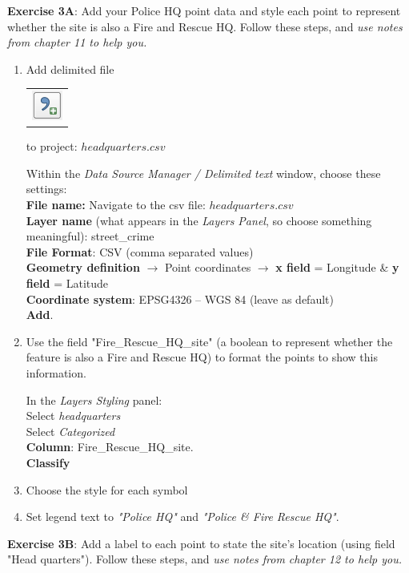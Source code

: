\documentclass{article}
\begin{document}
\textbf{Exercise 3A}: Add your Police HQ point data and style each point to represent whether the site is also a Fire and Rescue HQ. Follow these steps, and \emph{use notes from chapter 11 to help you.}
\begin{enumerate}
	\item Add delimited file
	\begin{tabular}{@{}c@{}}\includegraphics[width=3ex]{images/add_delimited_text_layer_icon.png}\end{tabular}
 	to project: $headquarters.csv$

	Within the \textit{Data Source Manager / Delimited text} window, choose these settings:\\
	\textbf{File name:} Navigate to the csv file: $headquarters.csv$\\
	\textbf{Layer name} (what appears in the \textit{Layers Panel}, so choose something meaningful): street\_crime\\
	\textbf{File Format}: CSV (comma separated values)\\
	\textbf{Geometry definition} $\rightarrow$ Point coordinates $\rightarrow$  
	\textbf{x field} = Longitude \& \textbf{y field} = Latitude\\
	\textbf{Coordinate system}: EPSG4326 – WGS 84 (leave as default)\\
	\textbf{Add}.

	\item Use the field "Fire\_Rescue\_HQ\_site" (a boolean to represent whether the feature is also a Fire and Rescue HQ) to format the points to show this information.
	
	In the \textit{Layers Styling} panel:\\
	Select \textit{headquarters}\\
	Select \textit{Categorized}\\
	\textbf{Column}: Fire\_Rescue\_HQ\_site.\\
	\textbf{Classify}
	\item Choose the style for each symbol
	\item Set legend text to \textit{"Police HQ"} and \textit{"Police \& Fire Rescue HQ"}.
\end{enumerate}

\newpage

\textbf{Exercise 3B}: Add a label to each point to state the site's location (using field "Head quarters"). Follow these steps, and \emph{use notes from chapter 12 to help you.}
\end{document}
